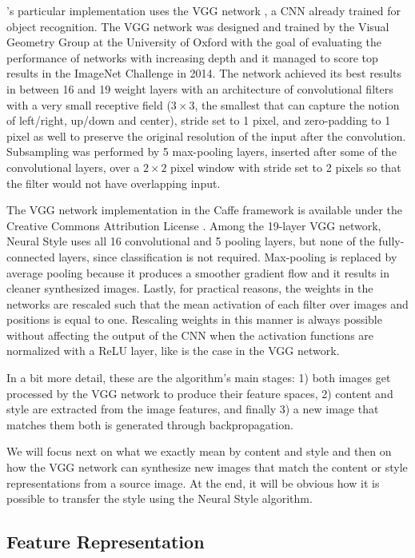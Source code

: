 \citeauthor{Gatys2015B}'s particular implementation uses the VGG network \cite{Simonyan2014}, a CNN already trained for object recognition.
The VGG network was designed and trained by the Visual Geometry Group at the University of Oxford with the goal of evaluating the performance of networks with increasing depth and it managed to score top results in the ImageNet Challenge in 2014.
The network achieved its best results in between 16 and 19 weight layers with an architecture of convolutional filters with a very small receptive field (${3}\times{3}$, the smallest that can capture the notion of left/right, up/down and center), stride set to 1 pixel, and zero-padding to 1 pixel as well to preserve the original resolution of the input after the convolution.
Subsampling was performed by 5 max-pooling layers, inserted after some of the convolutional layers, over a ${2}\times{2}$ pixel window with stride set to 2 pixels so that the filter would not have overlapping input.

The VGG network implementation in the Caffe framework is available under the Creative Commons Attribution License \cite{Simonyan2014web}.
Among the 19-layer VGG network, Neural Style uses all 16 convolutional and 5 pooling layers, but none of the fully-connected layers, since classification is not required.
Max-pooling is replaced by average pooling because it produces a smoother gradient flow \cite{Boureau2010} and it results in cleaner synthesized images.
Lastly, for practical reasons, the weights in the networks are rescaled such that the mean activation of each filter over images and positions is equal to one.
Rescaling weights in this manner is always possible without affecting the output of the CNN when the activation functions are normalized with a ReLU layer, like is the case in the VGG network.

In a bit more detail, these are the algorithm's main stages: 1) both images get processed by the VGG network to produce their feature spaces, 2) content and style are extracted from the image features, and finally 3) a new image that matches them both is generated through backpropagation.

We will focus next on what we exactly mean by content and style and then on how the VGG network can synthesize new images that match the content or style representations from a source image.
At the end, it will be obvious how it is possible to transfer the style using the Neural Style algorithm.


\subsection{Feature Representation}
\label{sub:system:method:representations}

